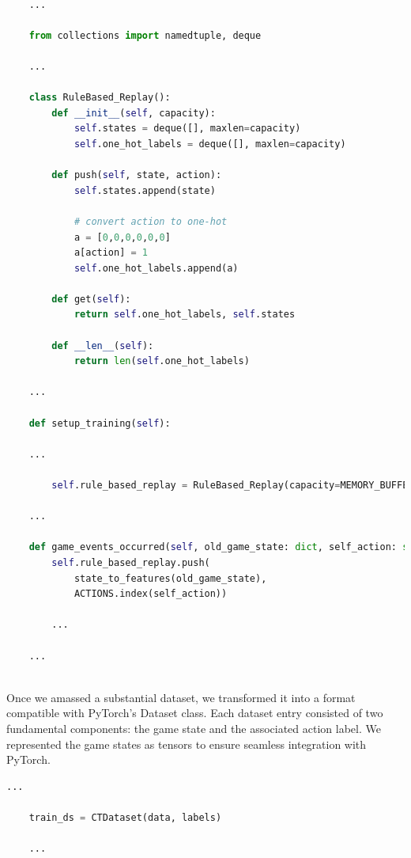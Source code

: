 \begin{lstlisting}[language=Python]
    
    ...

    from collections import namedtuple, deque

    ...

    class RuleBased_Replay():
        def __init__(self, capacity):
            self.states = deque([], maxlen=capacity)
            self.one_hot_labels = deque([], maxlen=capacity)

        def push(self, state, action):
            self.states.append(state)

            # convert action to one-hot
            a = [0,0,0,0,0,0]
            a[action] = 1
            self.one_hot_labels.append(a)

        def get(self):
            return self.one_hot_labels, self.states

        def __len__(self):
            return len(self.one_hot_labels)
        
    ...

    def setup_training(self):

    ...

        self.rule_based_replay = RuleBased_Replay(capacity=MEMORY_BUFFER)
    
    ...

    def game_events_occurred(self, old_game_state: dict, self_action: str, new_game_state: dict, events: List[str]):
        self.rule_based_replay.push(
            state_to_features(old_game_state), 
            ACTIONS.index(self_action))
        
        ...
    
    ...
    
\end{lstlisting}

Once we amassed a substantial dataset, we transformed it into a format compatible with PyTorch's Dataset class. 
Each dataset entry consisted of two fundamental components: the game state and the associated action label. We represented 
the game states as tensors to ensure seamless integration with PyTorch.

\begin{lstlisting}[language=Python]
    ...

    train_ds = CTDataset(data, labels)

    ...

\end{lstlisting}

